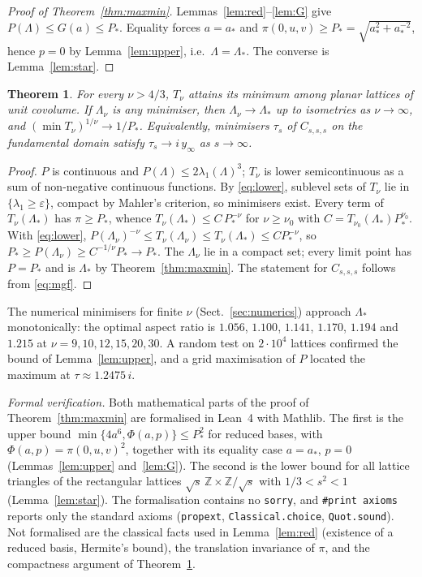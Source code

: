 \documentclass[10pt,twocolumn,a4paper]{article}
\newtheorem{theorem}{Theorem}
\theoremstyle{definition}
\newcommand{\Z}{\mathbb{Z}}
\begin{document}
\begin{proof}[Proof of Theorem~\ref{thm:maxmin}]
Lemmas~\ref{lem:red}--\ref{lem:G} give $P(\Lambda)\le G(a)\le P_*$. Equality forces $a=a_*$ and $\pi(0,u,v)\ge P_*=\sqrt{a_*^2+a_*^{-2}}$, hence $p=0$ by Lemma~\ref{lem:upper}, i.e.\ $\Lambda=\Lambda_*$. The converse is Lemma~\ref{lem:star}.
\end{proof}

\begin{theorem}\label{thm:limit}
For every $\nu>4/3$, $T_\nu$ attains its minimum among planar lattices of unit covolume. If $\Lambda_\nu$ is any minimiser, then $\Lambda_\nu\to\Lambda_*$ up to isometries as $\nu\to\infty$, and $(\min T_\nu)^{1/\nu}\to1/P_*$. Equivalently, minimisers $\tau_s$ of $C_{s,s,s}$ on the fundamental domain satisfy $\tau_s\to i\,y_\infty$ as $s\to\infty$.
\end{theorem}
\begin{proof}
$P$ is continuous and $P(\Lambda)\le2\lambda_1(\Lambda)^3$; $T_\nu$ is lower semicontinuous as a sum of non-negative continuous functions. By \eqref{eq:lower}, sublevel sets of $T_\nu$ lie in $\{\lambda_1\ge\varepsilon\}$, compact by Mahler's criterion, so minimisers exist. Every term of $T_\nu(\Lambda_*)$ has $\pi\ge P_*$, whence $T_\nu(\Lambda_*)\le C\,P_*^{-\nu}$ for $\nu\ge\nu_0$ with $C=T_{\nu_0}(\Lambda_*)P_*^{\nu_0}$. With \eqref{eq:lower},
$P(\Lambda_\nu)^{-\nu}\le T_\nu(\Lambda_\nu)\le T_\nu(\Lambda_*)\le CP_*^{-\nu}$, so $P_*\ge P(\Lambda_\nu)\ge C^{-1/\nu}P_*\to P_*$. The $\Lambda_\nu$ lie in a compact set; every limit point has $P=P_*$ and is $\Lambda_*$ by Theorem~\ref{thm:maxmin}. The statement for $C_{s,s,s}$ follows from \eqref{eq:mgf}.
\end{proof}
The numerical minimisers for finite $\nu$ (Sect.~\ref{sec:numerics}) approach $\Lambda_*$ monotonically: the optimal aspect ratio is $1.056$, $1.100$, $1.141$, $1.170$, $1.194$ and $1.215$ at $\nu=9,10,12,15,20,30$. A random test on $2\cdot10^4$ lattices confirmed the bound of Lemma~\ref{lem:upper}, and a grid maximisation of $P$ located the maximum at $\tau\approx1.2475\,i$.

\smallskip\noindent\emph{Formal verification.} Both mathematical parts of the proof of Theorem~\ref{thm:maxmin} are formalised in Lean~4 with Mathlib. The first is the upper bound $\min\{4a^6,\Phi(a,p)\}\le P_*^2$ for reduced bases, with $\Phi(a,p)=\pi(0,u,v)^2$, together with its equality case $a=a_*$, $p=0$ (Lemmas~\ref{lem:upper} and~\ref{lem:G}). The second is the lower bound for all lattice triangles of the rectangular lattices $\sqrt s\,\Z\times\Z/\sqrt s$ with $1/3<s^2<1$ (Lemma~\ref{lem:star}). The formalisation contains no \texttt{sorry}, and \texttt{\#print axioms} reports only the standard axioms (\texttt{propext}, \texttt{Classical.choice}, \texttt{Quot.sound}). Not formalised are the classical facts used in Lemma~\ref{lem:red} (existence of a reduced basis, Hermite's bound), the translation invariance of $\pi$, and the compactness argument of Theorem~\ref{thm:limit}.
\end{document}
